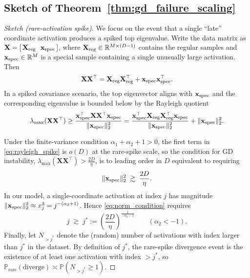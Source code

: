 \documentclass[11pt]{article}
\theoremstyle{plain}
\theoremstyle{definition}
\theoremstyle{remark}
\newcommand{\JSCheck}[1]{#1}
\begin{document}
\subsection{Sketch of Theorem~\ref{thm:gd_failure_scaling}}



\begin{proof}[Sketch (rare-activation spike)]
We focus on the event that a single ``late'' coordinate activation produces a spiked top eigenvalue.
Write the data matrix as $\mathbf{X}=[\,\mathbf{X}_{\rm reg}\ \ \mathbf{x}_{\rm spec}\,]$, where
$\mathbf{X}_{\rm reg}\in\mathbb{R}^{M\times(D-1)}$ contains the regular samples and
$\mathbf{x}_{\rm spec}\in\mathbb{R}^{M}$ is a special sample containing a single unusually large activation.
Then
\[
\mathbf{X}\mathbf{X}^\top
=
\mathbf{X}_{\rm reg}\mathbf{X}_{\rm reg}^\top+\mathbf{x}_{\rm spec}\mathbf{x}_{\rm spec}^\top.
\]
In a spiked covariance scenario, the top eigenvector aligns with $\mathbf{x}_{\rm spec}$ and the
corresponding eigenvalue is bounded below by the Rayleigh quotient
\begin{equation}
\lambda_{\max}(\mathbf{X}\mathbf{X}^\top)
\geq
\frac{\mathbf{x}_{\rm spec}^\top \mathbf{X}\mathbf{X}^\top \mathbf{x}_{\rm spec}}{\|\mathbf{x}_{\rm spec}\|_2^2}
=
\frac{\mathbf{x}_{\rm spec}^\top \mathbf{X}_{\rm reg}\mathbf{X}_{\rm reg}^\top \mathbf{x}_{\rm spec}}{\|\mathbf{x}_{\rm spec}\|_2^2}
+\|\mathbf{x}_{\rm spec}\|_2^2.
\label{eq:rayleigh_spike}
\end{equation}

\JSCheck{Under the finite-variance condition $\alpha_1+\alpha_2+1>0$, the first term in \eqref{eq:rayleigh_spike} is  $o(D)$ at the rare-spike scale}, so the condition for GD instability,
$\lambda_{\max}\!\left(\mathbf{X}\mathbf{X}^\top\right)>\frac{2D}{\eta}$, is to leading order in $D$
equivalent to requiring
\begin{equation*}
\|\mathbf{x}_{\rm spec}\|_2^2 \;\gtrsim\; \frac{2D}{\eta}.
\label{eq:norm_condition}
\end{equation*}
In our model, a single-coordinate activation at index $j$ has magnitude
$\|\mathbf{x}_{\rm spec}\|_2^2\approx x_j^2=j^{-(\alpha_2+1)}$. Hence \eqref{eq:norm_condition} requires
\begin{equation}
j \;\gtrsim\; j^\ast
:=
\left(\frac{2D}{\eta}\right)^{\frac{1}{-\alpha_2-1}}
\qquad(\alpha_2<-1).
\label{eq:j_star}
\end{equation}
Finally, let $N_{>j^\ast}$ denote the (random) number of activations with index larger than $j^\ast$ in the
dataset. By definition of $j^\ast$, the rare-spike divergence event is the existence of at least one activation with index $>j^\ast$, so $\mathbb{P}_{\mathrm{rare}}(\mathrm{diverge})\asymp \mathbb{P}(N_{>j^\ast}\geq 1)$.


\end{proof}
\end{document}
